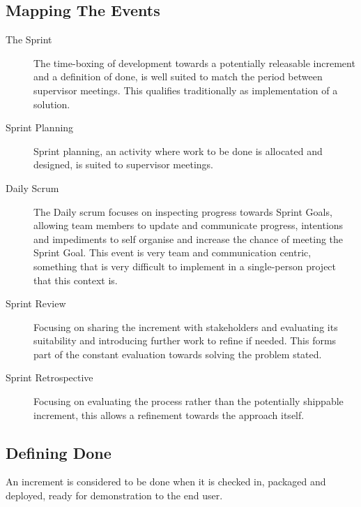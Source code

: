 \subsection{Mapping The Events}

\begin{description}
	\item[The Sprint] The time-boxing of development towards a potentially releasable increment and a definition of done, is well suited to match the period between supervisor meetings. This qualifies traditionally as implementation of a solution.
	
	\item[Sprint Planning] Sprint planning, an activity where work to be done is allocated and designed, is suited to supervisor meetings. 
	
	\item[Daily Scrum] The Daily scrum focuses on inspecting progress towards Sprint Goals, allowing team members to update and communicate progress, intentions and impediments to self organise and increase the chance of meeting the Sprint Goal. This event is very team and communication centric, something that is very difficult to implement in a single-person project that this context is.
	
	\item[Sprint Review] Focusing on sharing the increment with stakeholders and evaluating its suitability and introducing further work to refine if needed. This forms part of the constant evaluation towards solving the problem stated. 
	
	\item[Sprint Retrospective] Focusing on evaluating the process rather than the potentially shippable increment, this allows a refinement towards the approach itself.
	
\end{description}

\subsection{Defining Done}

An increment is considered to be done when it is checked in, packaged and deployed, ready for demonstration to the end user. 